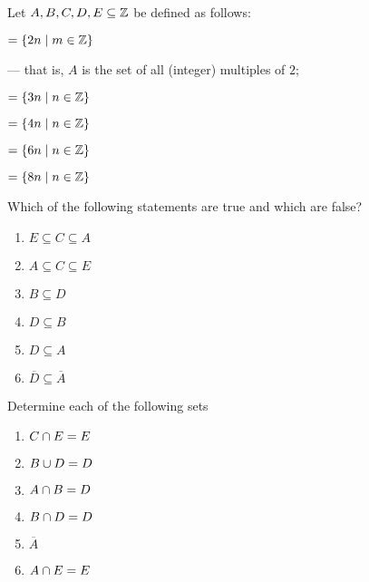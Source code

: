 \documentclass[a4paper, english, 12pt]{article} %
\begin{document}

\begin{problem}[4]
  Let $A, B, C, D, E \subseteq \mathbb{Z}$ be defined as follows:
  
  \begin{Tabbedenum}[label = \hspace{1cm}$\Alph*$]{2}
    \item \label{A} $= \{ 2n \mid m \in \mathbb{Z} \}$ 
    \item[] \hspace{-3cm} --- that is, $A$ is the set of all (integer) multiples of $2$;
    \item \label{B} $= \{ 3n \mid n \in \mathbb{Z} \}$ 
    \item \label{C} $= \{ 4n \mid n \in \mathbb{Z} \}$
    \item \label{D} $= \{ 6n \mid n \in \mathbb{Z} \}$
    \item \label{E} $= \{ 8n \mid n \in \mathbb{Z} \}$
  \end{Tabbedenum}
\end{problem}

\begin{subproblem}
  Which of the following statements are true and which are false?

  \begin{enumerate}[label = \textbf{\roman*})]
    \item $E \subseteq C \subseteq A$  
    \item $A \subseteq C \subseteq E$ 
    \item $B \subseteq D $ 
    \item $D \subseteq B $ 
    \item $D \subseteq A $ 
    \item $\overline{D} \subseteq \overline{A}$  
  \end{enumerate}
\end{subproblem}

\begin{subproblem}
  Determine each of the following sets

  \begin{enumerate}[label = \textbf{\roman*})]
    \item $ C \cap E \ans{= E}$ 
    \item $ B \cup D \ans{= D}$ 
    \item $ A \cap B \ans{= D}$ 
    \item $ B \cap D \ans{= D}$ 
    \item $ \overline{A}$  
    \item $ A \cap E \ans{= E}$ 
  \end{enumerate}

\end{subproblem}
\end{document}
